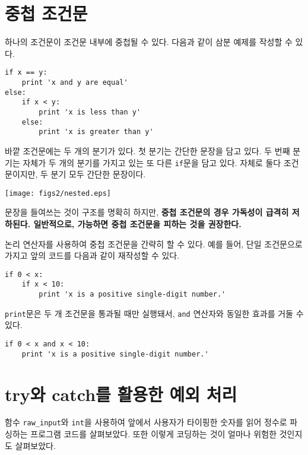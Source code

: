\section{중첩 조건문}

하나의 조건문이 조건문 내부에 중첩될 수 있다. 
다음과 같이 삼분 예제를 작성할 수 있다.

\beforeverb
\begin{verbatim}
if x == y:
    print 'x and y are equal'
else:
    if x < y:
        print 'x is less than y'
    else:
        print 'x is greater than y'
\end{verbatim}
\afterverb
%

바깥 조건문에는 두 개의 분기가 있다. 
첫 분기는 간단한 문장을 담고 있다. 
두 번째 분기는 자체가 두 개의 분기를 가지고 있는 또 다른 {\tt if}문을 담고 있다.
자체로 둘다 조건문이지만, 두 분기 모두 간단한 문장이다.

\beforefig
\centerline{\texttt{[image: figs2/nested.eps]}}
\afterfig

문장을 들여쓰는 것이 구조를 명확히 하지만, \bf{중첩 조건문}의 경우 가독성이 급격히 저하된다. 
일반적으로, 가능하면 중첩 조건문을 피하는 것을 권장한다.

논리 연산자를 사용하여 중첩 조건문을 간략히 할 수 있다. 
예를 들어, 단일 조건문으로 가지고 앞의 코드를 다음과 같이 재작성할 수 있다.

\beforeverb
\begin{verbatim}
if 0 < x:
    if x < 10:
        print 'x is a positive single-digit number.'
\end{verbatim}
\afterverb
%

{\tt print}문은 두 개 조건문을 통과될 때만 실행돼서, {\tt and} 연산자와 동일한 효과를 거둘 수 있다.

\beforeverb
\begin{verbatim}
if 0 < x and x < 10:
    print 'x is a positive single-digit number.'
\end{verbatim}
\afterverb


\section{try와 catch를 활용한 예외 처리}

함수 \verb"raw_input"와 {\tt int}을 사용하여 앞에서 사용자가 타이핑한 숫자를 읽어 정수로 파싱하는 프로그램 코드를 살펴보았다.
또한 이렇게 코딩하는 것이 얼마나 위험한 것인지도 살펴보았다.

